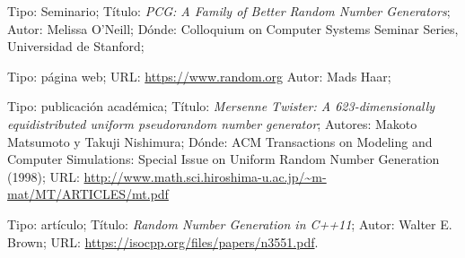 \documentclass{article}
\begin{document}
Tipo: Seminario;
Título: \emph{PCG: A Family of Better Random Number Generators};
Autor: Melissa O'Neill;
Dónde: Colloquium on Computer Systems Seminar Series, Universidad de Stanford;

Tipo: página web;
URL: \url{https://www.random.org}
Autor: Mads Haar;

Tipo: publicación académica;
Título: \emph{Mersenne Twister: A 623-dimensionally equidistributed uniform pseudorandom number generator};
Autores: Makoto Matsumoto y Takuji Nishimura;
Dónde: ACM Transactions on Modeling and Computer Simulations: Special Issue on Uniform Random Number Generation (1998);
URL: \url{http://www.math.sci.hiroshima-u.ac.jp/~m-mat/MT/ARTICLES/mt.pdf}

Tipo: artículo;
Título: \emph{Random Number Generation in C++11};
Autor: Walter E. Brown;
URL: \url{https://isocpp.org/files/papers/n3551.pdf}.
\end{document}
